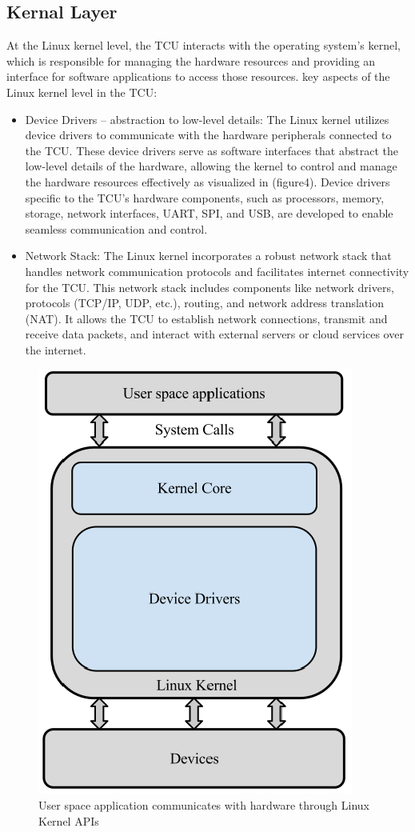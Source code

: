 \documentclass[
12pt,
oneside, 
onehalfspacing, 
nolistspacing, 
parskip, 
chapterinoneline, 
]{AASTCOMPUTER}
\begin{document}
\subsection{Kernal Layer}
    At the Linux kernel level, the TCU interacts with the operating system's kernel, which is responsible for managing the hardware resources and providing an interface for software applications to access those resources. key aspects of the Linux kernel level in the TCU:
    \begin{itemize}
  \item Device Drivers – abstraction to low-level details: The Linux kernel utilizes device drivers to communicate with the hardware peripherals connected to the TCU. These device drivers serve as software interfaces that abstract the low-level details of the hardware, allowing the kernel to control and manage the hardware resources effectively as visualized in (figure4). Device drivers specific to the TCU's hardware components, such as processors, memory, storage, network interfaces, UART, SPI, and USB, are developed to enable seamless communication and control.
  \item Network Stack: The Linux kernel incorporates a robust network stack that handles network communication protocols and facilitates internet connectivity for the TCU. This network stack includes components like network drivers, protocols (TCP/IP, UDP, etc.), routing, and network address translation (NAT). It allows the TCU to establish network connections, transmit and receive data packets, and interact with external servers or cloud services over the internet.
\end{itemize}

  
\begin{figure}[h]
\centering
\includegraphics[scale=0.4]{Figures/LinuxKernel.png}
\caption[Kernel Layer]{User space application communicates with hardware through Linux Kernel APIs}
\label{fig:Kernel Layer}
\end{figure}
\clearpage
\end{document}
